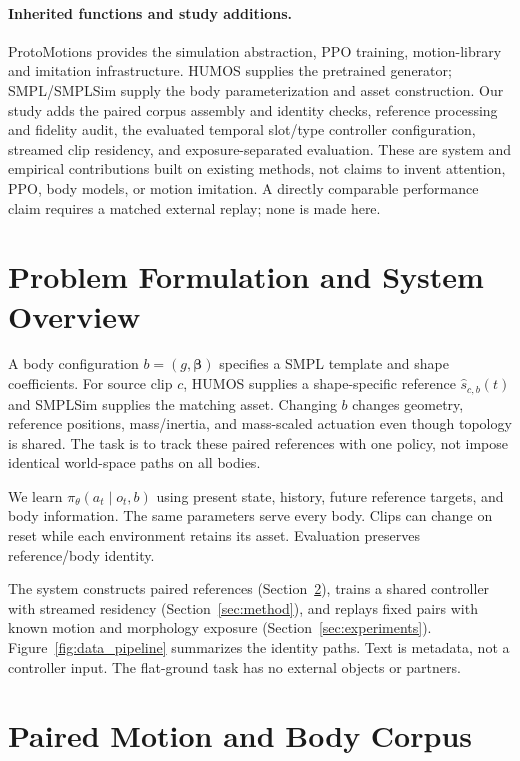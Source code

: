 \documentclass[11pt]{article}
\begin{document}
\paragraph{Inherited functions and study additions.}
ProtoMotions provides the simulation abstraction, PPO training, motion-library
and imitation infrastructure. HUMOS supplies the pretrained generator;
SMPL/SMPLSim supply the body parameterization and asset construction. Our
study adds the paired corpus assembly and identity checks, reference
processing and fidelity audit, the evaluated temporal slot/type controller
configuration, streamed clip residency, and exposure-separated evaluation.
These are system and empirical contributions built on existing methods,
not claims to invent attention, PPO, body models, or motion imitation.
A directly comparable performance claim requires a matched external replay;
none is made here.

\section{Problem Formulation and System Overview}\label{sec:problem}
A body configuration $b=(g,\boldsymbol{\beta})$ specifies a SMPL template
and shape coefficients. For source clip $c$, HUMOS supplies a shape-specific
reference $\hat{s}_{c,b}(t)$ and SMPLSim supplies the matching asset. Changing
$b$ changes geometry, reference positions, mass/inertia, and mass-scaled
actuation even though topology is shared. The task is to track these paired
references with one policy, not impose identical world-space paths on all bodies.

We learn $\pi_\theta(a_t\mid o_t,b)$ using present state, history, future
reference targets, and body information. The same parameters serve every
body. Clips can change on reset while each environment retains its asset.
Evaluation preserves reference/body identity.

The system constructs paired references (Section~\ref{sec:dataset}), trains
a shared controller with streamed residency (Section~\ref{sec:method}), and
replays fixed pairs with known motion and morphology exposure
(Section~\ref{sec:experiments}). Figure~\ref{fig:data_pipeline} summarizes
the identity paths. Text is metadata, not a controller input. The flat-ground
task has no external objects or partners.

\section{Paired Motion and Body Corpus}\label{sec:dataset}
\end{document}
